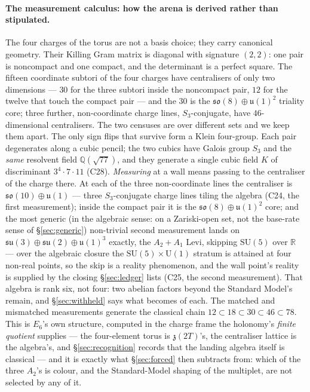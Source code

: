 \documentclass[11pt,a4paper]{article}
\theoremstyle{definition}
\theoremstyle{remark}
\newcommand{\Q}{\mathbb{Q}}
\newcommand{\R}{\mathbb{R}}
\begin{document}
\paragraph{The measurement calculus: how the arena is derived rather than stipulated.} The four charges of the torus are not
a basis choice; they carry canonical geometry. Their Killing Gram matrix is diagonal with signature $(2,2)$: one pair is
noncompact and one compact, and the determinant is a perfect square. The fifteen coordinate subtori of the four charges have
centralisers of only two dimensions --- $30$ for the three subtori inside the noncompact pair, $12$ for the twelve that touch
the compact pair --- and the $30$ is the $\mathfrak{so}(8) \oplus \mathfrak{u}(1)^2$ triality core; three further,
non-coordinate charge lines, $S_3$-conjugate, have $46$-dimensional centralisers. The two censuses are over different sets and
we keep them apart. The only sign flips that survive form a Klein four-group. Each pair degenerates along a cubic pencil; the two cubics have Galois group $S_3$ and the \emph{same}
resolvent field $\Q(\sqrt{77})$, and they generate a single cubic field $K$ of discriminant $3^4 \cdot 7 \cdot 11$ (C28).
\emph{Measuring} at a wall means passing to the centraliser of the charge there. At each of the three non-coordinate lines the
centraliser is $\mathfrak{so}(10) \oplus \mathfrak{u}(1)$ --- three $S_3$-conjugate charge lines tiling the algebra (C24,
the first measurement); inside the compact pair it is the $\mathfrak{so}(8) \oplus \mathfrak{u}(1)^2$ core; and the most
generic (in the algebraic sense: on a Zariski-open set, not the base-rate sense of \S\ref{sec:generic}) non-trivial second measurement lands on $\mathfrak{su}(3) \oplus \mathfrak{su}(2) \oplus \mathfrak{u}(1)^3$
exactly, the $A_2{+}A_1$ Levi, skipping $\mathrm{SU}(5)$ over $\R$ --- over the algebraic closure the
$\mathrm{SU}(5) \times \mathrm{U}(1)$ stratum is attained at four non-real points, so the skip is a reality phenomenon,
and the wall point's reality is supplied by the closing \S\ref{sec:ledger} lists (C25, the second measurement). That algebra is rank six, not four: two
abelian factors beyond the Standard Model's remain, and \S\ref{sec:withheld} says what becomes of each. The matched and
mismatched measurements generate the classical chain $12 \subset 18 \subset 30 \subset 46 \subset 78$. This is $E_6$'s own
structure, computed in the charge frame the holonomy's \emph{finite quotient} supplies --- the four-element torus is
$\mathfrak{z}(2T)$'s, the centraliser lattice is the algebra's, and \S\ref{sec:recognition} records that the landing algebra itself is classical --- and it is exactly what
\S\ref{sec:forced} then subtracts from: which of the three $A_2$'s is colour, and the Standard-Model shaping of the multiplet,
are not selected by any of it.
\end{document}
